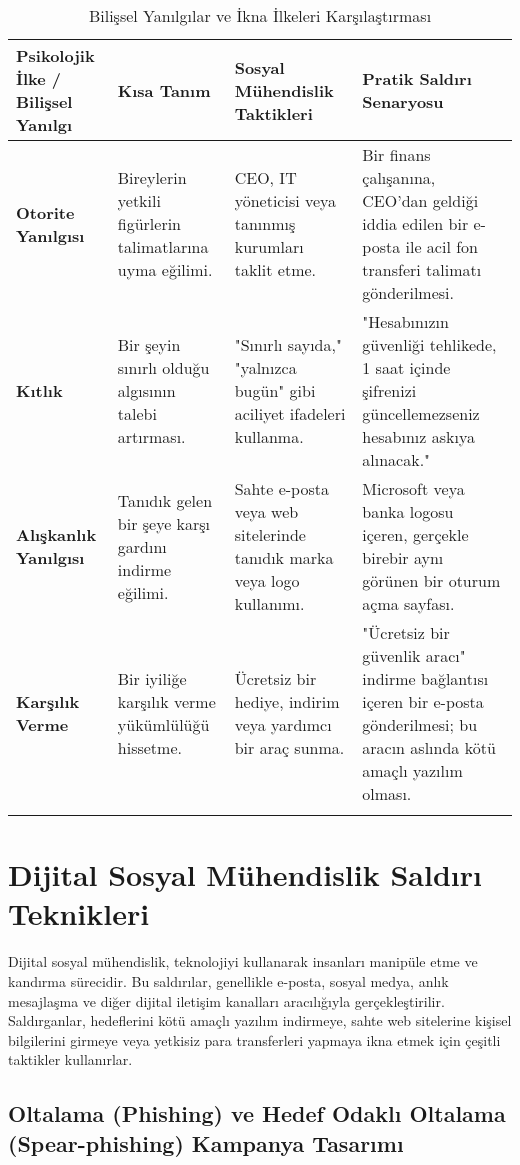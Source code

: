 \begin{longtable}{|p{4.5cm}|p{4.5cm}|p{4.5cm}|p{4.5cm}|}
    \hline
    \textbf{Psikolojik İlke / Bilişsel Yanılgı} & \textbf{Kısa Tanım} & \textbf{Sosyal Mühendislik Taktikleri} & \textbf{Pratik Saldırı Senaryosu} \\
    \hline
    \endhead
    \textbf{Otorite Yanılgısı} & Bireylerin yetkili figürlerin talimatlarına uyma eğilimi. & CEO, IT yöneticisi veya tanınmış kurumları taklit etme. & Bir finans çalışanına, CEO'dan geldiği iddia edilen bir e-posta ile acil fon transferi talimatı gönderilmesi. \\
    \hline
    \textbf{Kıtlık} & Bir şeyin sınırlı olduğu algısının talebi artırması. & "Sınırlı sayıda," "yalnızca bugün" gibi aciliyet ifadeleri kullanma. & "Hesabınızın güvenliği tehlikede, 1 saat içinde şifrenizi güncellemezseniz hesabınız askıya alınacak." \\
    \hline
    \textbf{Alışkanlık Yanılgısı} & Tanıdık gelen bir şeye karşı gardını indirme eğilimi. & Sahte e-posta veya web sitelerinde tanıdık marka veya logo kullanımı. & Microsoft veya banka logosu içeren, gerçekle birebir aynı görünen bir oturum açma sayfası. \\
    \hline
    \textbf{Karşılık Verme} & Bir iyiliğe karşılık verme yükümlülüğü hissetme. & Ücretsiz bir hediye, indirim veya yardımcı bir araç sunma. & "Ücretsiz bir güvenlik aracı" indirme bağlantısı içeren bir e-posta gönderilmesi; bu aracın aslında kötü amaçlı yazılım olması. \\
    \hline
\caption{Bilişsel Yanılgılar ve İkna İlkeleri Karşılaştırması}
\end{longtable}

\section{Dijital Sosyal Mühendislik Saldırı Teknikleri}

Dijital sosyal mühendislik, teknolojiyi kullanarak insanları manipüle etme ve kandırma sürecidir. Bu saldırılar, genellikle e-posta, sosyal medya, anlık mesajlaşma ve diğer dijital iletişim kanalları aracılığıyla gerçekleştirilir. Saldırganlar, hedeflerini kötü amaçlı yazılım indirmeye, sahte web sitelerine kişisel bilgilerini girmeye veya yetkisiz para transferleri yapmaya ikna etmek için çeşitli taktikler kullanırlar.

\subsection{Oltalama (Phishing) ve Hedef Odaklı Oltalama (Spear-phishing) Kampanya Tasarımı}

